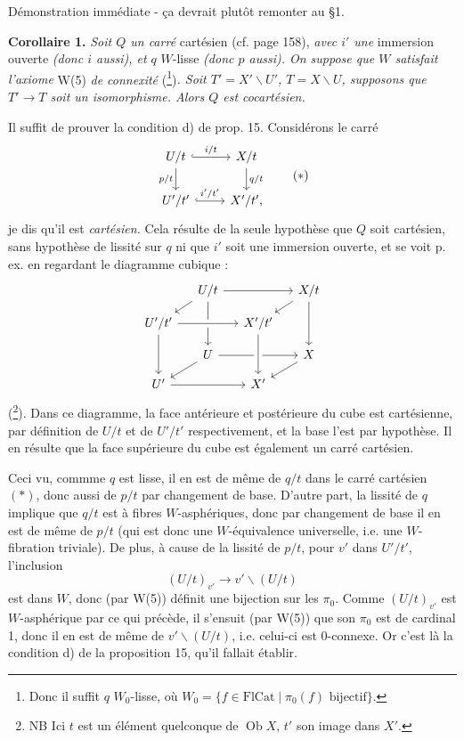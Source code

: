 \documentclass[11pt]{article}
\newcommand{\printedpage}[1]{\marginpar{\footnotesize p.~#1}}
\newcommand{\msp}[1]{\marginpar{\footnotesize [#1]}}
\newcommand{\Cat}{\mathrm{Cat}}
\newcommand{\Fl}{\mathrm{Fl}}
\newcommand{\Ob}{\operatorname{Ob}}
\begin{document}
\msp{page 159}
Démonstration immédiate - ça devrait plutôt remonter au §1.

\textbf{Corollaire 1.} \textit{Soit $Q$ un carré} cartésien (cf. page 158), \textit{avec $i'$ une} immersion ouverte \textit{(donc $i$ aussi), et $q$} $W$-lisse \textit{(donc $p$ aussi). On suppose que $W$ satisfait l'axiome} W(5) \textit{de connexité} (\footnote[109]{Donc il suffit $q$ $W_0$-lisse, où $W_0 = \{f \in \Fl \Cat \mid \pi_0(f) \text{ bijectif}\}$.})\textit{. Soit $T' = X' \backslash U'$, $T = X \backslash U$, supposons que $T' \longrightarrow T$ soit un isomorphisme. Alors $Q$ est cocartésien.}

Il suffit de prouver la condition d) de prop. 15. Considérons le carré
\[
\begin{tikzcd}
U/t \ar[r, hook, "i/t"] \ar[d, "p/t"'] & X/t \ar[d, "q/t"] \\
U'/t' \ar[r, hook, "i'/t'"] & X'/t',
\end{tikzcd}
\tag*{$(*)$}
\]
je dis qu'il est \textit{cartésien.} Cela résulte de la seule hypothèse que $Q$ soit cartésien, sans hypothèse de lissité sur $q$ ni que $i'$ soit une immersion ouverte, et se voit p. ex. en regardant le diagramme cubique :
\printedpage{110}
\[
\begin{tikzcd}[row sep=small, column sep=small]
& U/t \ar[rr] \ar[dl] \ar[dd] & & X/t \ar[dl] \ar[dd] \\
U'/t' \ar[rr, crossing over] \ar[dd] & & X'/t' & \\
& U \ar[rr] \ar[dl] & & X \ar[dl] \\
U' \ar[rr] & & X' \ar[from=uu, crossing over] &
\end{tikzcd}
\]
(\footnote[110]{NB Ici $t$ est un élément quelconque de $\Ob X$, $t'$ son image dans $X'$.}). Dans ce diagramme, la face antérieure et postérieure du cube est cartésienne, par définition de $U/t$ et de $U'/t'$
\msp{page 160}
respectivement, et la base l'est par hypothèse. Il en résulte que la face supérieure du cube est également un carré cartésien.

Ceci vu, commme $q$ est lisse, il en est de même de $q/t$ dans le carré cartésien $(*)$, donc aussi de $p/t$ par changement de base. D'autre part, la lissité de $q$ implique que $q/t$ est à fibres $W$-asphériques, donc par changement de base il en est de même de $p/t$ (qui est donc une $W$-équivalence universelle, i.e. une $W$-fibration triviale). De plus, à cause de la lissité de $p/t$, pour $v'$ dans $U'/t'$, l'inclusion %
\[
(U/t)_{v'} \longrightarrow v' \backslash (U/t)
\]
est dans $W$, donc (par W(5)) définit une bijection sur les $\pi_0$. Comme $(U/t)_{v'}$ est $W$-asphérique par ce qui précède, il s'ensuit (par W(5)) que son $\pi_0$ est de cardinal 1, donc il en est de même de $v' \backslash (U/t)$, i.e. celui-ci est 0-connexe. Or c'est là la condition d) de la proposition 15, qu'il fallait établir.
\end{document}
